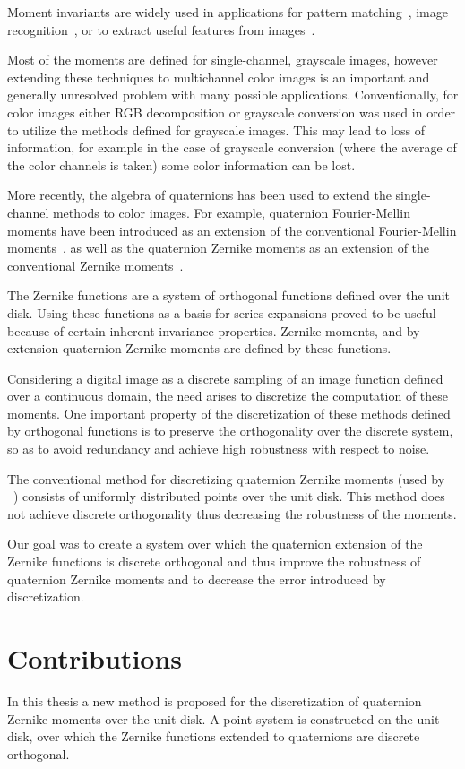 Moment invariants are widely used in applications for pattern matching~\cite{app2}, image recognition~\cite{pattern_recognition}, or to extract useful features from images~\cite{zernike_nn}.

Most of the moments are defined for single-channel, grayscale images, however extending these techniques to multichannel color images is an important and generally unresolved problem with many possible applications. Conventionally, for color images either RGB decomposition or grayscale conversion was used in order to utilize the methods defined for grayscale images. This may lead to loss of information, for example in the case of grayscale conversion (where the average of the color channels is taken) some color information can be lost.

More recently, the algebra of quaternions has been used to extend the single-channel methods to color images. For example, quaternion Fourier-Mellin moments have been introduced as an extension of the conventional Fourier-Mellin moments~\cite{qfmm}, as well as the quaternion Zernike moments as an extension of the conventional Zernike moments~\cite{qzm}.

The Zernike functions are a system of orthogonal functions defined over the unit disk. Using these functions as a basis for series expansions proved to be useful because of certain inherent invariance properties. Zernike moments, and by extension quaternion Zernike moments are defined by these functions.

Considering a digital image as a discrete sampling of an image function defined over a continuous domain, the need arises to discretize the computation of these moments. One important property of the discretization of these methods defined by orthogonal functions is to preserve the orthogonality over the discrete system, so as to avoid redundancy and achieve high robustness with respect to noise.

The conventional method for discretizing quaternion Zernike moments (used by \citeauthor{qzmi}~\cite{qzmi}) consists of uniformly distributed points over the unit disk. This method does not achieve discrete orthogonality thus decreasing the robustness of the moments. 

Our goal was to create a system over which the quaternion extension of the Zernike functions is discrete orthogonal and thus improve the robustness of quaternion Zernike moments and to decrease the error introduced by discretization.


\section{Contributions}
In this thesis a new method is proposed for the discretization of quaternion Zernike moments over the unit disk. A point system is constructed on the unit disk, over which the Zernike functions extended to quaternions are discrete orthogonal. 

